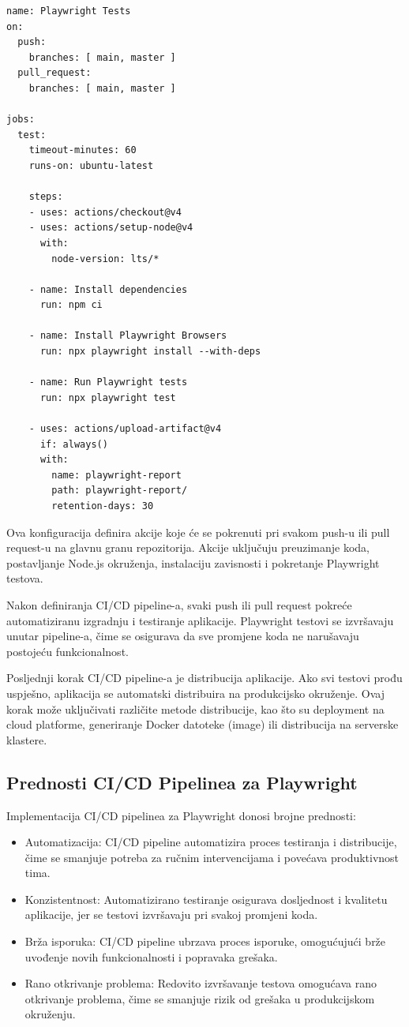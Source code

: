 \begin{verbatim}
name: Playwright Tests
on:
  push:
    branches: [ main, master ]
  pull_request:
    branches: [ main, master ]

jobs:
  test:
    timeout-minutes: 60
    runs-on: ubuntu-latest

    steps:
    - uses: actions/checkout@v4
    - uses: actions/setup-node@v4
      with:
        node-version: lts/*

    - name: Install dependencies
      run: npm ci

    - name: Install Playwright Browsers
      run: npx playwright install --with-deps

    - name: Run Playwright tests
      run: npx playwright test

    - uses: actions/upload-artifact@v4
      if: always()
      with:
        name: playwright-report
        path: playwright-report/
        retention-days: 30
\end{verbatim}
Ova konfiguracija definira akcije koje će se pokrenuti pri svakom push-u ili pull request-u na glavnu granu repozitorija. Akcije uključuju preuzimanje koda, postavljanje Node.js okruženja, instalaciju zavisnosti i pokretanje Playwright testova.

Nakon definiranja CI/CD pipeline-a, svaki push ili pull request pokreće automatiziranu izgradnju i testiranje aplikacije. 
Playwright testovi se izvršavaju unutar pipeline-a, čime se osigurava da sve promjene koda ne narušavaju postojeću funkcionalnost.

Posljednji korak CI/CD pipeline-a je distribucija aplikacije. 
Ako svi testovi prođu uspješno, aplikacija se automatski distribuira na produkcijsko okruženje. 
Ovaj korak može uključivati različite metode distribucije, kao što su deployment na cloud platforme, generiranje Docker datoteke (image) ili distribucija na serverske klastere.

\subsection*{Prednosti CI/CD Pipelinea za Playwright}
Implementacija CI/CD pipelinea za Playwright donosi brojne prednosti:
\begin{itemize}
    \item Automatizacija: CI/CD pipeline automatizira proces testiranja i distribucije, čime se smanjuje potreba za ručnim intervencijama i povećava produktivnost tima.
    \item Konzistentnost: Automatizirano testiranje osigurava dosljednost i kvalitetu aplikacije, jer se testovi izvršavaju pri svakoj promjeni koda.
    \item Brža isporuka: CI/CD pipeline ubrzava proces isporuke, omogućujući brže uvođenje novih funkcionalnosti i popravaka grešaka.
    \item Rano otkrivanje problema: Redovito izvršavanje testova omogućava rano otkrivanje problema, čime se smanjuje rizik od grešaka u produkcijskom okruženju.
\end{itemize}


